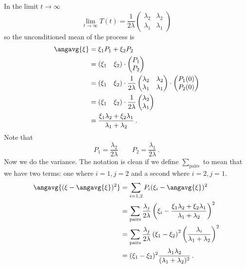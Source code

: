 In the limit $t \rightarrow \infty$
\begin{equation*}
	\lim_{t \rightarrow \infty}T(t) = \frac{1}{2\lambda}
	\begin{pmatrix}
		\lambda_2 & \lambda_2 \\ \lambda_1 & \lambda_1
	\end{pmatrix}
\end{equation*}
so the unconditioned mean of the process is
\begin{align*}
  \angavg{\xi}
  &= \xi_1 P_1 + \xi_2 P_2 \\
  &= \left(\xi_1 \quad \xi_2 \right) \cdot \begin{pmatrix} P_1 \\ P_2 \end{pmatrix} \\
  &= \left(\xi_1 \quad \xi_2 \right)
  \cdot \frac{1}{2\lambda}
  \begin{pmatrix}
  \lambda_2 & \lambda_2 \\ \lambda_1 & \lambda_1
  \end{pmatrix}
  \cdot \begin{pmatrix} P_1(0) \\ P_2(0) \end{pmatrix} \\
  &= \left(\xi_1 \quad \xi_2 \right)
  \cdot \frac{1}{2\lambda}
  \begin{pmatrix} \lambda_2 \\ \lambda_1 \end{pmatrix} \\
  &= \frac{\xi_1 \lambda_2 + \xi_2 \lambda_1}{\lambda_1 + \lambda_2}
  \, .
\end{align*}
Note that
\begin{equation*}
  P_1 = \frac{\lambda_2}{2 \lambda} \qquad P_2 = \frac{\lambda_1}{2 \lambda}
  \, .
\end{equation*}
Now we do the variance.
The notation is clean if we define $\sum_\text{pairs}$ to mean that we have two terms: one where $i=1, j=2$ and a second where $i=2, j=1$.
\begin{align*}
  \angavg{(\xi - \angavg{\xi})^2}
  &= \sum_{i=1,2} P_i (\xi_i - \angavg{\xi})^2 \\
  &= \sum_\text{pairs} \frac{\lambda_j}{2 \lambda} \left( \xi_i - \frac{\xi_1 \lambda_2 + \xi_2 \lambda_1}{\lambda_1 + \lambda_2}\right)^2 \\
  &= \sum_\text{pairs} \frac{\lambda_j}{2 \lambda} \left( \xi_1 - \xi_2 \right)^2 \left( \frac{\lambda_i}{\lambda_1 + \lambda_2} \right)^2 \\
  &= (\xi_1 - \xi_2)^2 \frac{\lambda_1 \lambda_2}{(\lambda_1 + \lambda_2)^2}
  \, .
\end{align*}
